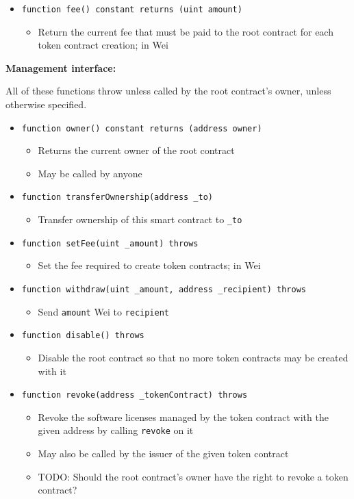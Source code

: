 \documentclass[a4paper]{article}
\newcommand{\todo}[1]{\textsf{TODO: #1}}
\begin{document}
\begin{itemize}
  \item \texttt{function fee() constant returns (uint amount)}
  \begin{itemize}
    \item Return the current fee that must be paid to the root contract for each token contract creation; in Wei
  \end{itemize}
\end{itemize}

\textbf{Management interface:}

All of these functions throw unless called by the root contract's owner, unless otherwise specified.

\begin{itemize}
  \item \texttt{function owner() constant returns (address owner)}
  \begin{itemize}
    \item Returns the current owner of the root contract
    \item May be called by anyone
  \end{itemize}

  \item \texttt{function transferOwnership(address \_to)}
  \begin{itemize}
    \item Transfer ownership of this smart contract to \texttt{\_to}
  \end{itemize}

  \item \texttt{function setFee(uint \_amount) throws}
  \begin{itemize}
    \item Set the fee required to create token contracts; in Wei
  \end{itemize}
  
  \item \texttt{function withdraw(uint \_amount, address \_recipient) throws}
  \begin{itemize}
    \item Send \texttt{amount} Wei to \texttt{recipient}
  \end{itemize}
  
  \item \texttt{function disable() throws}
  \begin{itemize}
    \item Disable the root contract so that no more token contracts may be created with it
  \end{itemize}
  
  \item \texttt{function revoke(address \_tokenContract) throws}
  \begin{itemize}
    \item Revoke the software licenses managed by the token contract with the given address by calling \texttt{revoke} on it
    \item May also be called by the issuer of the given token contract
    \item \todo{Should the root contract's owner have the right to revoke a token contract?}
  \end{itemize}
\end{itemize}
\end{document}
